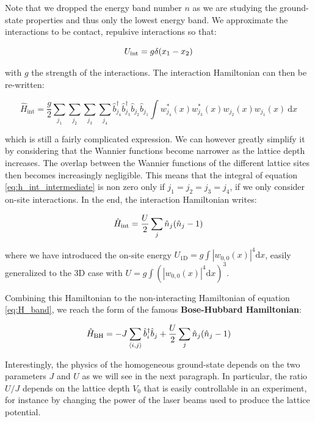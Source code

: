 \noindent Note that we dropped the energy band number $n$ as we are studying the ground-state properties and thus only the lowest energy band. We approximate the interactions to be contact, repulsive interactions so that:

\begin{equation}
    U_{\rm{int}}= g \delta (x_1 - x_2)
\end{equation}

\noindent with $g$ the strength of the interactions. The interaction Hamiltonian can then be re-written:

\begin{equation}
    \hat{H}_{\mathrm{int}}=\frac{g}{2} \sum_{j_{1}} \sum_{j_{2}} \sum_{j_{3}} \sum_{j_{4}} \hat{b}_{j_{4}}^{\dagger} \hat{b}_{j_{3}}^{\dagger} \hat{b}_{j_{2}} \hat{b}_{j_{1}} \int w_{j_{4}}^{*}(x) w_{j_{3}}^{*}(x) w_{j_{2}}(x) w_{j_{1}}(x) \mathrm{~d} x
    \label{eq:h_int_intermediate}
\end{equation}

\noindent which is still a fairly complicated expression. We can however greatly simplify it by considering that the Wannier functions become narrower as the lattice depth increases. The overlap between the Wannier functions of the different lattice sites then becomes increasingly negligible. This means that the integral of equation \ref{eq:h_int_intermediate} is non zero only if $j_1=j_2=j_3=j_4$, \ie if we only consider on-site interactions. In the end, the interaction Hamiltonian writes:

\begin{equation}
    \hat{H}_{\rm{int}}=\frac{U}{2} \sum_j \hat{n}_j (\hat{n}_j -1)
\end{equation}

\noindent where we have introduced the on-site energy $U_{\mathrm{1D}}=g \int\left|w_{0,0}(x)\right|^{4} \mathrm{d}x$, easily generalized to the 3D case with $U=g \int(\left|w_{0,0}(x)\right|^{4} \mathrm{d}x)^3$. 

Combining this Hamiltonian to the non-interacting Hamiltonian of equation \ref{eq:H_band}, we reach the form of the famous \textbf{Bose-Hubbard Hamiltonian}:

\begin{equation}
    \hat{H}_{\mathrm{BH}}= -J \sum_{\left\langle i,j\right\rangle} \hat{b}^{\dagger}_i \hat{b}_j + \frac{U}{2} \sum_j \hat{n}_j (\hat{n}_j -1)
\end{equation}

\noindent Interestingly, the physics of the homogeneous ground-state depends on the two parameters $J$ and $U$ as we will see in the next paragraph. In particular, the ratio $U/J$ depends on the lattice depth $V_0$ that is easily controllable in an experiment, for instance by changing the power of the laser beams used to produce the lattice potential.


